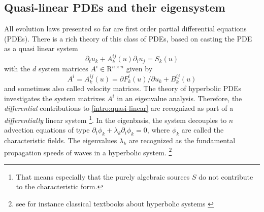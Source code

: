 \subsection[Quasi-linear PDEs]{Quasi-linear PDEs and 
their eigensystem}\label{sec:intro-eigensystems}
All evolution laws presented so far are first order partial differential
equations (PDEs). There is a rich theory of this class of PDEs, based on
casting the PDE as a quasi linear system
\begin{equation}\label{intro:quasi-linear}
\partial_t u_k + A^{ij}_k(u) \partial_i u_j = S_k(u)
\end{equation}
with the $d$ system matrices $A^i\in\mathrm R^{n\times n}$ given by
\begin{equation}
A^i = A^{ij}_k(u) = \partial F^i_k(u) / \partial u_k + B^{ij}_k(u)
\end{equation}
and sometimes also called velocity matrices.
The theory of hyperbolic PDEs investigates the system matrixes $A^i$ in an
eigenvalue analysis. Therefore, the \emph{differential} contributions to 
\eqref{intro:quasi-linear} are recognized as part of a \emph{differentially} linear system
\footnote{
  That means especially that the purely algebraic sources $S$ do not contribute
  to the characteristic form.
}.
In the eigenbasis, the system decouples to $n$ advection equations of type
$\partial_t \phi_k + \lambda_k \partial_i \phi_k = 0$, where $\phi_k$ are
called the characteristic fields. The eigenvalues $\lambda_k$ are 
recognized as the fundamental propagation speeds of waves in
a hyperbolic system. \footnote{see for instance classical textbooks about 
hyperbolic systems \cite{Toro99,Leveque92}}


